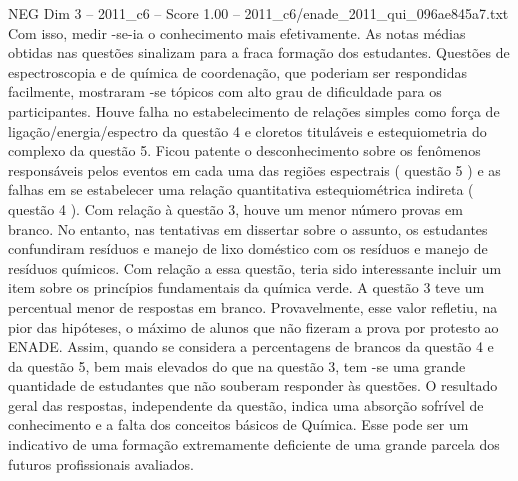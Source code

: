 \begin{textsample}{NEG Dim 3 – 2011\_c6 – Score 1.00 – 2011\_c6/enade\_2011\_qui\_096ae845a7.txt}
Com isso, medir -se-ia o conhecimento mais efetivamente.
As notas médias obtidas nas questões sinalizam para a fraca formação dos estudantes.
Questões de espectroscopia e de química de coordenação, que poderiam ser respondidas facilmente, mostraram -se tópicos com alto grau de dificuldade para os participantes.
Houve falha no estabelecimento de relações simples como força de ligação/energia/espectro da questão 4 e cloretos tituláveis e estequiometria do complexo da questão 5.
Ficou patente o desconhecimento sobre os fenômenos responsáveis pelos eventos em cada uma das regiões espectrais ( questão 5 ) e as falhas em se estabelecer uma relação quantitativa estequiométrica indireta ( questão 4 ).
Com relação à questão 3, houve um menor número provas em branco.
No entanto, nas tentativas em dissertar sobre o assunto, os estudantes confundiram resíduos e manejo de lixo doméstico com os resíduos e manejo de resíduos químicos.
Com relação a essa questão, teria sido interessante incluir um item sobre os princípios fundamentais da química verde.
A questão 3 teve um percentual menor de respostas em branco.
Provavelmente, esse valor refletiu, na pior das hipóteses, o máximo de alunos que não fizeram a prova por protesto ao ENADE.
Assim, quando se considera a percentagens de brancos da questão 4 e da questão 5, bem mais elevados do que na questão 3, tem -se uma grande quantidade de estudantes que não souberam responder às questões.
O resultado geral das respostas, independente da questão, indica uma absorção sofrível de conhecimento e a falta dos conceitos básicos de Química.
Esse pode ser um indicativo de uma formação extremamente deficiente de uma grande parcela dos futuros profissionais avaliados.

\end{textsample}
